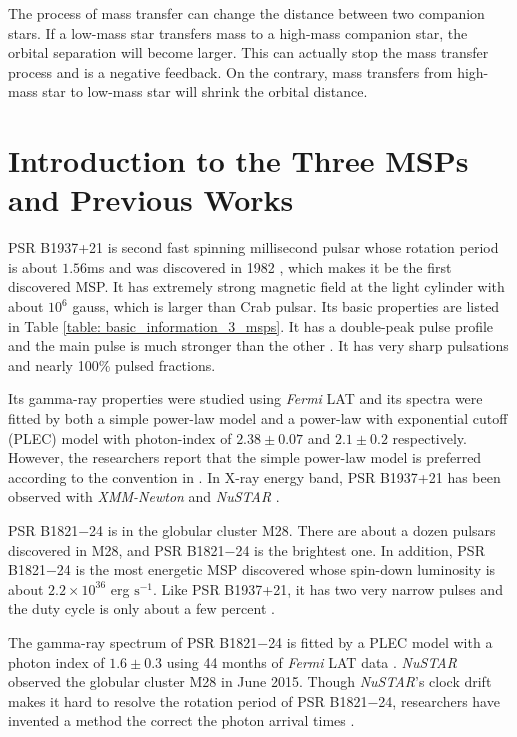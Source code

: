 \documentclass[a4paper, 12pt]{report}
\begin{document}
        The process of mass transfer can change the distance between two 
        companion stars. If a low-mass star transfers mass to a high-mass companion star,
        the orbital separation will become larger. This can actually stop the mass transfer
        process and is a negative feedback. On the contrary, mass transfers from high-mass 
        star to low-mass star will shrink the orbital distance.
                       
    
  \section{Introduction to the Three MSPs and Previous Works}
    PSR B1937+21 is second fast spinning millisecond pulsar whose rotation period 
    is about $1.56$ms and was discovered in 1982 
    \citep{1982Natur.300..615B}, which makes it be the first discovered MSP. It has 
    extremely strong magnetic field at the light cylinder with about $10^6$ gauss, which 
    is larger than Crab pulsar. Its basic properties are listed in Table 
    \ref{table: basic_information_3_msps}. It has a double-peak pulse profile and the main 
    pulse is much stronger than the other \citep{j1939_pulse_profile}. It has very sharp 
    pulsations and nearly 100\% pulsed fractions. 
    
    Its gamma-ray properties were studied using \textit{Fermi} LAT and its 
    spectra were fitted by both a simple power-law model and a power-law with exponential
    cutoff (PLEC) model with photon-index of $2.38\pm0.07$ and $2.1\pm0.2$ respectively. 
    However, the researchers report that the simple power-law model is preferred according 
    to the convention in \citet{0067-0049-208-2-17} \citep{0004-637X-787-2-167}. In X-ray 
    energy band, PSR B1937+21 has been observed with \textit{XMM-Newton} and \textit{NuSTAR} 
    \citep{0004-637X-787-2-167,0004-637X-845-2-159}.
    
    PSR B1821$-$24 is in the globular cluster M28. There 
    are about a dozen pulsars discovered in M28, and PSR B1821$-$24 is the brightest one. 
    In addition, PSR B1821$-$24 is the most energetic MSP discovered whose spin-down
    luminosity is about $2.2\times 10^{36}$ erg $\mbox{s}^{-1}$. Like PSR B1937+21, it has 
    two very narrow pulses and the duty cycle is only about a few percent
    \citep{1538-4357-627-2-L125}.

    The gamma-ray spectrum of PSR B1821$-$24 is fitted by a PLEC model with a photon index of 
    $1.6\pm0.3$ using 44 months of \textit{Fermi} LAT data \citep{2013ApJ...778..106J}.
    \textit{NuSTAR} observed the globular cluster M28 in June 2015. Though \textit{NuSTAR}'s
    clock drift makes it hard to resolve the rotation period of PSR B1821$-$24, 
    researchers have invented a method the correct the photon arrival times
    \citep{0004-637X-845-2-159}.
    
\end{document}
